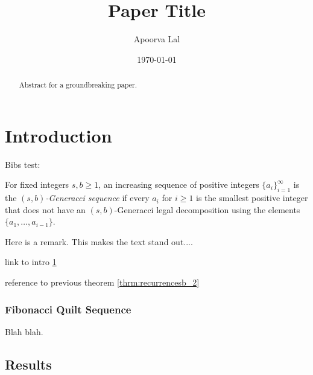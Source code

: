 \documentclass[12pt,reqno]{amsart} %
\title{Paper Title}
\author{Apoorva Lal}
\date{\today}
\begin{document}
\begin{abstract} Abstract for a groundbreaking paper.
\end{abstract}

\maketitle



\section{Introduction} \label{intro}

Bibs test:

\be
\item \cite{CarterFoundationsmathematicaleconomics2001}
\item \cite{CasellaStatisticalinference2002}
\ee


\begin{defi}\label{sbDefi}
For fixed integers $s, b \geq 1$, an increasing sequence of positive
integers $\{a_i\}_{i=1}^\infty$ is the {\em $(s,b)$-Generacci
sequence} if every $a_i$ for $i \geq 1$ is the smallest positive
integer that does not have an $(s,b)$-Generacci legal decomposition
using the elements $\{a_1, \dots, a_{i-1}\}$.
\end{defi}

\lipsum[1]

\begin{rek} Here is a remark. This makes the text stand out.... \end{rek}


link to intro \ref{intro}

reference to previous theorem \ref{thrm:recurrencesb_2}

\subsubsection{Fibonacci Quilt Sequence}  Blah blah.

\subsection{Results}

\lipsum[5]
\end{document}
